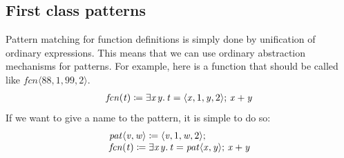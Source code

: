 \documentclass[acmsmall,review,dvipsnames]{acmart}
\newcommand{\Varid}[1]{\mathit{#1}}
\begin{document}


\subsection{First class patterns}
Pattern matching for function definitions is simply done by unification of ordinary expressions.
This means that we can use ordinary abstraction mechanisms for patterns.
For example, here is a function that should be called like \ensuremath{\Varid{fcn}\langle\mathrm{88},\mathrm{1},\mathrm{99},\mathrm{2}\rangle}.
$$
\begin{array}{l}
\ensuremath{\Varid{fcn}(\Varid{t})\mathrel{\coloneqq}\exists\Varid{x}\hspace{0.3mm}\Varid{y}.\,\Varid{t}\mathrel{=}\langle{}\Varid{x},\mathrm{1},\Varid{y},\mathrm{2}\rangle;\,\Varid{x}\mathbin{+}\Varid{y}}
\end{array}
$$
If we want to give a name to the pattern, it is simple to do so:
$$
\begin{array}{l}
\ensuremath{\Varid{pat}\langle\Varid{v},\Varid{w}\rangle\mathrel{\coloneqq}\langle{}\Varid{v},\mathrm{1},\Varid{w},\mathrm{2}\rangle;\,} \\
\ensuremath{\Varid{fcn}(\Varid{t})\mathrel{\coloneqq}\exists\Varid{x}\hspace{0.3mm}\Varid{y}.\,\Varid{t}\mathrel{=}\Varid{pat}\langle\Varid{x},\Varid{y}\rangle;\,\Varid{x}\mathbin{+}\Varid{y}}
\end{array}
$$
\end{document}
